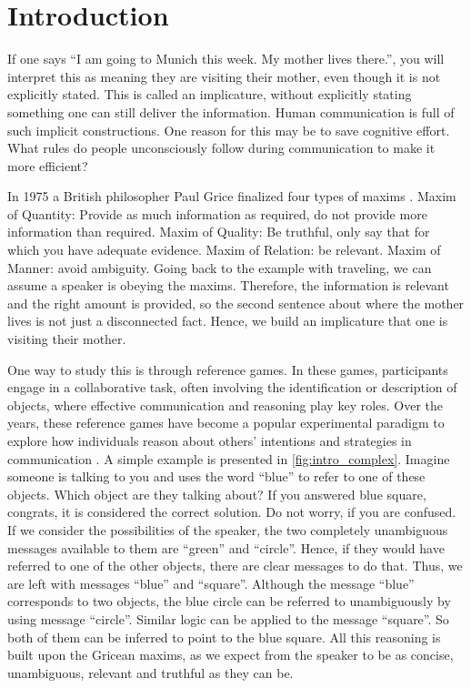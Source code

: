 \section*{Introduction} \label{sec:intro}
If one says ``I am going to Munich this week. My mother lives there.'', you will interpret this as meaning they are visiting their mother, even though it is not explicitly stated. This is called an implicature, without explicitly stating something one can still deliver the information. Human communication is full of such implicit constructions. One reason for this may be to save cognitive effort. What rules do people unconsciously follow during communication to make it more efficient?

In 1975 a British philosopher Paul Grice finalized four types of maxims \citep{Grice_1975}. Maxim of Quantity: Provide as much information as required, do not provide more information than required. Maxim of Quality: Be truthful, only say that for which you have adequate evidence. Maxim of Relation: be relevant. Maxim of Manner: avoid ambiguity. Going back to the example with traveling, we can assume a speaker is obeying the maxims. Therefore, the information is relevant and the right amount is provided, so the second sentence about where the mother lives is not just a disconnected fact. Hence, we build an implicature that one is visiting their mother.

One way to study this is through reference games. In these games, participants engage in a collaborative task, often involving the identification or description of objects, where effective communication and reasoning play key roles. Over the years, these reference games have become a popular experimental paradigm to explore how individuals reason about others' intentions and strategies in communication \citep{Frank_2012,Franke_2016}. A simple example is presented in \autoref{fig:intro_complex}. Imagine someone is talking to you and uses the word ``blue'' to refer to one of these objects. Which object are they talking about? If you answered blue square, congrats, it is considered the correct solution. Do not worry, if you are confused. If we consider the possibilities of the speaker, the two completely unambiguous messages available to them are ``green'' and ``circle''. Hence, if they would have referred to one of the other objects, there are clear messages to do that. Thus, we are left with messages ``blue'' and ``square''. Although the message ``blue'' corresponds to two objects, the blue circle can be referred to unambiguously by using message ``circle''. Similar logic can be applied to the message ``square''. So both of them can be inferred to point to the blue square. All this reasoning is built upon the Gricean maxims, as we expect from the speaker to be as concise, unambiguous, relevant and truthful as they can be. 

